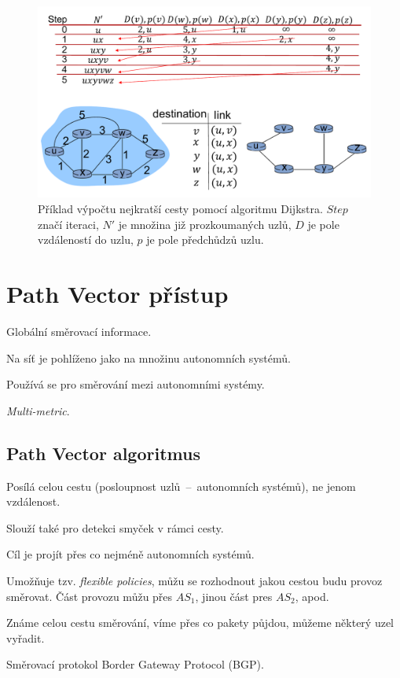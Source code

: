\begin{figure}[H]
    \centering
    \includegraphics[width=1\linewidth]{dijkstra_example.pdf}
    \caption{Příklad výpočtu nejkratší cesty pomocí algoritmu Dijkstra. $Step$ značí iteraci, $N'$ je množina již prozkoumaných uzlů, $D$ je pole vzdáleností do uzlu, $p$ je pole předchůdzů uzlu.}
\end{figure}


\section{Path Vector přístup}

\begin{compactitem}
    \item Globální směrovací informace.
    \item Na síť je pohlíženo jako na množinu autonomních systémů.
    \item Používá se pro směrování mezi autonomními systémy.
    \item \textit{Multi-metric}.
\end{compactitem}

\subsection*{Path Vector algoritmus}

\begin{compactitem}
    \item Posílá celou cestu (posloupnost uzlů~--~autonomních systémů), ne jenom vzdálenost.
    \item Slouží také pro detekci smyček v rámci cesty.
    \item Cíl je projít přes co nejméně autonomních systémů.
    \item Umožňuje tzv. \textit{flexible policies}, můžu se rozhodnout jakou cestou budu provoz směrovat. Část provozu můžu přes $AS_1$, jinou část pres $AS_2$, apod.
    \item Známe celou cestu směrování, víme přes co pakety půjdou, můžeme některý uzel vyřadit.
    \item Směrovací protokol Border Gateway Protocol (BGP).
\end{compactitem}
